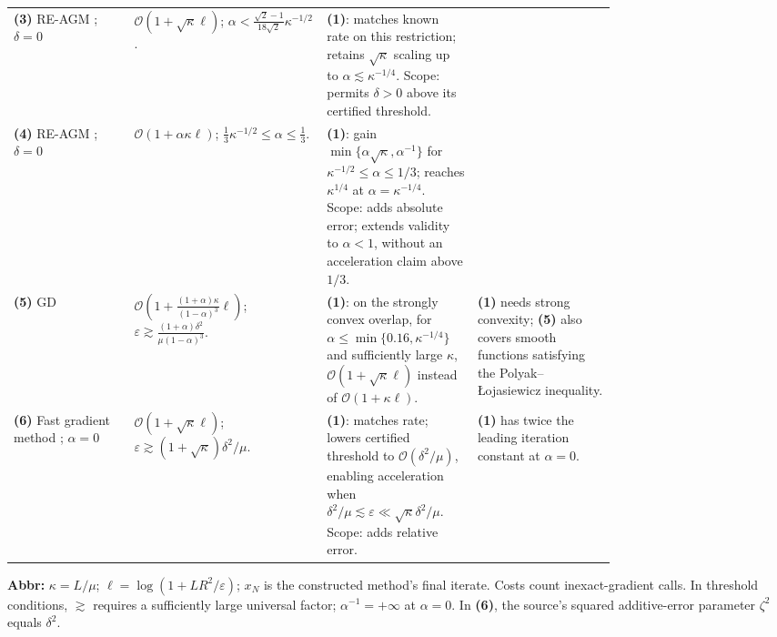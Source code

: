 \begin{table}[tp]
\begin{threeparttable}
\begin{tabularx}{\linewidth}{@{}>{\raggedright\arraybackslash}p{0.20\linewidth}>{\raggedright\arraybackslash}p{0.32\linewidth}>{\raggedright\arraybackslash}p{0.25\linewidth}>{\raggedright\arraybackslash}X@{}}
& \\
\midrule
\textbf{(3)} RE-AGM \citep[Thm.~4]{igscVasinEtAl2025v3}; $\delta=0$
& $\mathcal{O}(1+\sqrt\kappa\ell)$; $\alpha<\frac{\sqrt2-1}{18\sqrt2}\kappa^{-1/2}$.
& \textbf{(1)}: matches known rate on this restriction; retains $\sqrt\kappa$ scaling up to $\alpha\lesssim\kappa^{-1/4}$. Scope: permits $\delta>0$ above its certified threshold.
& \\
\midrule
\textbf{(4)} RE-AGM \citep[Thm.~5]{igscVasinEtAl2025v3}; $\delta=0$
& $\mathcal{O}(1+\alpha\kappa\ell)$; $\frac13\kappa^{-1/2}\le\alpha\le\frac13$.
& \textbf{(1)}: gain $\min\{\alpha\sqrt\kappa,\alpha^{-1}\}$ for $\kappa^{-1/2}\le\alpha\le1/3$; reaches $\kappa^{1/4}$ at $\alpha=\kappa^{-1/4}$. Scope: adds absolute error; extends validity to $\alpha<1$, without an acceleration claim above $1/3$.
& \\
\midrule
\textbf{(5)} GD \citep[Thm.~5.2]{igscVasinGasnikov2026v1}
& $\mathcal{O}\!\left(1+\frac{(1+\alpha)\kappa}{(1-\alpha)^3}\ell\right)$; $\varepsilon\gtrsim\frac{(1+\alpha)\delta^2}{\mu(1-\alpha)^3}$.
& \textbf{(1)}: on the strongly convex overlap, for $\alpha\le\min\{0.16,\kappa^{-1/4}\}$ and sufficiently large $\kappa$, $\mathcal{O}(1+\sqrt\kappa\ell)$ instead of $\mathcal{O}(1+\kappa\ell)$.
& \textbf{(1)} needs strong convexity; \textbf{(5)} also covers smooth functions satisfying the Polyak--\L{}ojasiewicz inequality. \\
\midrule
\textbf{(6)} Fast gradient method \citep[Thm.~3.3]{igscGaucherEtAl2026v1}; $\alpha=0$
& $\mathcal{O}(1+\sqrt\kappa\ell)$; $\varepsilon\gtrsim(1+\sqrt\kappa)\delta^2/\mu$.
& \textbf{(1)}: matches rate; lowers certified threshold to $\mathcal{O}(\delta^2/\mu)$, enabling acceleration when $\delta^2/\mu\lesssim\varepsilon\ll\sqrt\kappa\delta^2/\mu$. Scope: adds relative error.
& \textbf{(1)} has twice the leading iteration constant at $\alpha=0$. \\
\bottomrule
\end{tabularx}
\begin{tablenotes}[flushleft]\footnotesize
\item[] \textbf{Abbr:} $\kappa=L/\mu$; $\ell=\log(1+LR^2/\varepsilon)$; $x_N$ is the constructed method's final iterate. Costs count inexact-gradient calls. In threshold conditions, $\gtrsim$ requires a sufficiently large universal factor; $\alpha^{-1}=+\infty$ at $\alpha=0$. In \textbf{(6)}, the source's squared additive-error parameter $\zeta^2$ equals $\delta^2$.
\end{tablenotes}
\end{threeparttable}
\end{table}
\clearpage
